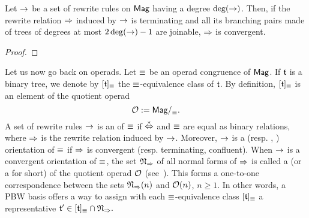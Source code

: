 \begin{Lemma} \label{lem:degree_confluence}
    Let $\operatorname{\to}$ be a set of rewrite rules on $\mathsf{Mag}$ having a degree
    $\mathrm{deg}(\operatorname{\to})$. Then, if the rewrite relation $\operatorname{\Rightarrow}$ induced by
    $\operatorname{\to}$ is terminating and all its branching pairs made of trees of
    degrees at most $2 \, \mathrm{deg}(\operatorname{\to}) - 1$ are joinable, $\operatorname{\Rightarrow}$ is
    convergent.
\end{Lemma}
\begin{proof}
\end{proof}
\medbreak

Let us now go back on operads. Let $\operatorname{\equiv}$ be an operad congruence of
$\mathsf{Mag}$. If $\mathfrak{t}$ is a binary tree, we denote by $[\mathfrak{t}]_{\operatorname{\equiv}}$ the
$\operatorname{\equiv}$-equivalence class of $\mathfrak{t}$. By definition, $[\mathfrak{t}]_{\operatorname{\equiv}}$
is an element of the quotient operad
\begin{equation}
    \mathcal{O} := \mathsf{Mag}/_{\operatorname{\equiv}}.
\end{equation}
A set of rewrite rules $\operatorname{\to}$ is an  of $\operatorname{\equiv}$ if
$\operatorname{\overset{\ast}{\Leftrightarrow}}$ and $\operatorname{\equiv}$ are equal as binary relations, where
$\operatorname{\Rightarrow}$ is the rewrite relation induced by $\operatorname{\to}$. Moreover,
$\operatorname{\to}$ is a  (resp. , )
orientation of $\operatorname{\equiv}$ if $\operatorname{\Rightarrow}$ is convergent (resp.
terminating, confluent). When $\operatorname{\to}$ is a convergent orientation of
$\operatorname{\equiv}$, the set $\mathfrak{N}_{\operatorname{\Rightarrow}}$ of all normal forms of
$\operatorname{\Rightarrow}$ is called a  (or a
 for short) of the quotient operad $\mathcal{O}$
(see~\cite{Hof10,DK10}). This forms a one-to-one correspondence between
the sets $\mathfrak{N}_{\operatorname{\Rightarrow}}(n)$ and $\mathcal{O}(n)$, $n \geq 1$. In
other words, a PBW basis offers a way to assign with each
$\operatorname{\equiv}$-equivalence class $[\mathfrak{t}]_{\operatorname{\equiv}}$ a representative
\begin{math}
    \mathfrak{t}' \in [\mathfrak{t}]_{\operatorname{\equiv}} \cap \mathfrak{N}_{\operatorname{\Rightarrow}}.
\end{math}
\medbreak


